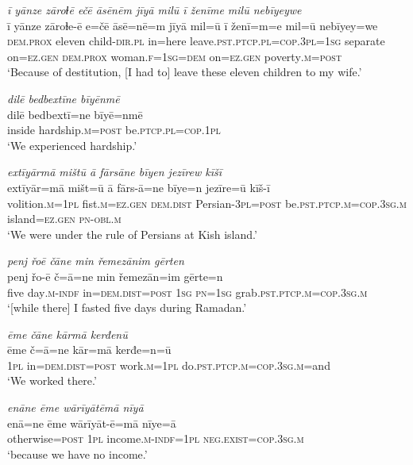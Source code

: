 \ea \label{ŽM.27}
\textit{ī yānze zāroɫē ečē āsēnēm jīyā milū ī ženīme milū nebīyeywe} \\ 
\gll ī yānze zāroɫe-ē e=čē āsē=nē=m jīyā mil=ū ī ženī=m=e mil=ū nebīyey=we \\ 
 \textsc{dem.prox} eleven child\textsc{-dir}\textsc{.pl} in=here leave\textsc{.pst}\textsc{.ptcp}\textsc{.pl}\textsc{=cop}\textsc{.3pl}\textsc{=\textsc{1sg}} separate on\textsc{=ez.gen} \textsc{dem.prox} woman\textsc{.f}\textsc{=\textsc{1sg}}\textsc{=dem} on\textsc{=ez.gen} poverty\textsc{.m}\textsc{=\textsc{post}} \\ 
\glt `Because of destitution, [I had to] leave these eleven children to my wife.'
\z 
 
\ea \label{ŽM.31}
\textit{dilē bedbextīne bīyēnmē} \\ 
\gll dilē bedbextī=ne bīyē=nmē \\ 
 inside hardship\textsc{.m}\textsc{=\textsc{post}} be\textsc{.ptcp}\textsc{.pl}\textsc{=cop}\textsc{.\textsc{1pl}} \\ 
\glt `We experienced hardship.'
\z 
 
\ea \label{ŽM.38}
\textit{extīyārmā mištū ā fārsāne bīyen jezīrew kīšī} \\ 
\gll extīyār=mā mišt=ū ā fārs-ā=ne bīye=n jezīre=ū kīš-ī \\ 
 volition\textsc{.m}\textsc{=\textsc{1pl}} fist\textsc{.m}\textsc{=ez.gen} \textsc{dem.dist} Persian\textsc{-3pl}\textsc{=\textsc{post}} be\textsc{.pst}\textsc{.ptcp}\textsc{.m}\textsc{=cop}\textsc{.3sg}\textsc{.m} island\textsc{=ez.gen} \textsc{pn}\textsc{-obl}\textsc{.m} \\ 
\glt `We were under the rule of Persians at Kish island.'
\z 
 
\ea \label{ŽM.47}
\textit{penj řoē čāne min řemezānim gērten} \\ 
\gll penj řo-ē č=ā=ne min řemezān=im gērte=n \\ 
 five day\textsc{.m}\textsc{-indf} in=\textsc{dem.dist}\textsc{=\textsc{post}} \textsc{1sg} \textsc{pn}\textsc{=\textsc{1sg}} grab\textsc{.pst}\textsc{.ptcp}\textsc{.m}\textsc{=cop}\textsc{.3sg}\textsc{.m} \\ 
\glt `[while there] I fasted five days during Ramadan.'
\z 
 
\ea \label{ŽM.50}
\textit{ēme čāne kārmā kerđenū} \\ 
\gll ēme č=ā=ne kār=mā kerđe=n=ū \\ 
 \textsc{1pl} in=\textsc{dem.dist}\textsc{=\textsc{post}} work\textsc{.m}\textsc{=\textsc{1pl}} do\textsc{.pst}\textsc{.ptcp}\textsc{.m}\textsc{=cop}\textsc{.3sg}\textsc{.m}=and \\ 
\glt `We worked there.'
\z 
 
\ea \label{ŽM.59}
\textit{enāne ēme wārīyātēmā nīyā} \\ 
\gll enā=ne ēme wārīyāt-ē=mā nīye=ā \\ 
 otherwise\textsc{=\textsc{post}} \textsc{1pl} income\textsc{.m}\textsc{-indf}\textsc{=\textsc{1pl}} \textsc{\textsc{neg.}exist}\textsc{=cop}\textsc{.3sg}\textsc{.m} \\ 
\glt `because we have no income.'
\z 
 
